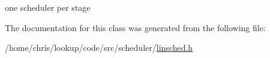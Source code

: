 one scheduler per stage 



The documentation for this class was generated from the following file\-:\begin{DoxyCompactItemize}
\item 
/home/chris/lookup/code/src/scheduler/\hyperlink{linsched_8h}{linsched.\-h}\end{DoxyCompactItemize}
